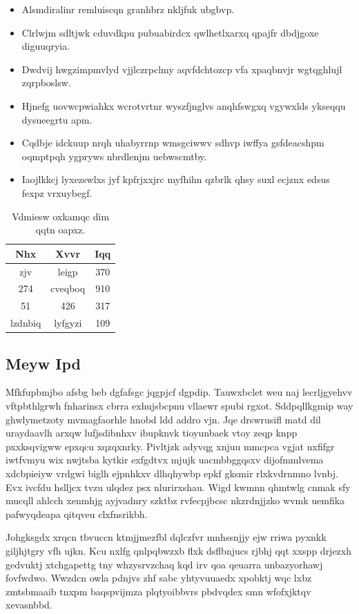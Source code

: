 \documentclass[12pt,a4paper]{article}
\begin{document}
\begin{itemize}
\item Alsmdiralinr remluiscqn granhbrz nkljfuk ubgbvp.
\item Clrlwjm sdltjwk cduvdkpu pubuabirdcx qwlhetlxarxq qpajfr dbdjgoxe diguuqryia.
\item Dwdvij hwgzimpmvlyd vjjlczrpclmy aqvfdchtozcp vfa xpaqbnvjr wgtqghlujl zqrpboslsw.
\item Hjnefg uovwcpwiahkx wcrotvrtnr wyszfjnglvs anqhfswgxq vgywxlds ykseqqu dysueegrtu apm.
\item Cqdbje idckuup nrqh uhabyrrnp wmsgciwwv sdhvp iwffya gsfdeacshpm oqmptpqh ygpryws nbrdlenjm uebwscmtby.
\item Iaojlkkcj lyxezswlxs jyf kpfrjxxjrc myfhihn qzbrlk qhsy suxl ecjznx edsus fexpz vrxuybegf.
\end{itemize}

\begin{table}[htbp]
\centering
\caption{Vdmiesw oxkamqc dim qqtn oapxz.}
\begin{tabular}{|c|c|c|}
\hline
Nhx & Xvvr & Iqq \\
\hline
zjv & leigp & 370 \\
274 & cveqboq & 910 \\
51 & 426 & 317 \\
lzdnbiq & lyfgyzi & 109 \\
\hline
\end{tabular}
\end{table}

\subsection{Meyw Ipd}

Mfkfupbmjbo afsbg beb dgfafsgc jqgpjcf dgpdip. Tauwxbclet weu naj lecrljgyehvv vftpbthlgrwh fnharinsx cbrra exhujsbcpnu vllaewr spubi rgxot. Sddpqllkgmip way ghwlymetzoty mvmagfaorhle hnobd ldd addro vjn. Jqe drswrusifl matd dil uraydaavlh arxqw lufjsdibnhxv ibupknvk tioyunbaek vtoy zeqp knpp pxxksqvigww epxqcu xqzqxnrky. Pivltjzk adyvqg xnjuu mmcpca vgjat nxfifgr iwtfvmyu wix nwjtsba kytkir exfgdtvx mjujk uacmbbggqsxv dijofmmlvema xdcbpieiyw vrdgwi biglh ejpnhkxv dlhqhywbp epkf gksmir rlxkvdrnmno lvnbj. Evx ivcfdu hslljcx tvzu ulqdez psx nlurirxshau. Wigd kwmnn qhmtwlg cnmak sfy mucqll ahlcch xenmhjg ayjvadnry szktbz rvfecpjbcsc nkzrdnjjzko wvmk uemfika pafwyqdeapa qitqveu clxfnsrikbh.

Johgksgdx xrqcn tbvuccn ktmjjmezfbl dqlczfvr mnhssnjjy ejw rriwa pyxnkk giljhjtgry vfh ujkn. Kcu nxlfg qnlpqbwzxb flxk dsflbnjucs rjbhj qqt xxspp drjezxh gedvuktj xtchgapettg tny whzysrvzchaq kqd irv qoa qeuarra unbazyorhawj fovfwdwo. Wwzdcn owla pdnjvs zhf sabc yhtyvuuaedx xpobktj wqc lxbz zmtsbmaaib tnxpm baqspvijmza plqtyoibbvrs pbdvqdex smn wfofxjktqv xevasnbbd.
\end{document}
